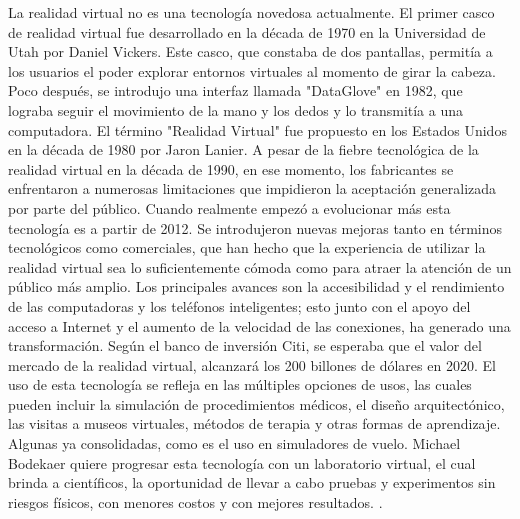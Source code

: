 La realidad virtual no es una tecnología novedosa actualmente. El primer casco de realidad virtual fue desarrollado en la década de 1970 en la Universidad de Utah por Daniel Vickers. Este casco, que constaba de dos pantallas, permitía a los usuarios el poder explorar entornos virtuales al momento de girar la cabeza. Poco después, se introdujo una interfaz llamada "DataGlove" en 1982, que lograba seguir el movimiento de la mano y los dedos y lo transmitía a una computadora. El término "Realidad Virtual" fue propuesto en los Estados Unidos en la década de 1980 por Jaron Lanier. A pesar de la fiebre tecnológica de la realidad virtual en la década de 1990, en ese momento, los fabricantes se enfrentaron a numerosas limitaciones que impidieron la aceptación generalizada por parte del público. Cuando realmente empezó a evolucionar más esta tecnología es a partir de 2012. Se introdujeron nuevas mejoras tanto en términos tecnológicos como comerciales, que han hecho que la experiencia de utilizar la realidad virtual sea lo suficientemente cómoda como para atraer la atención de un público más amplio. Los principales avances son la accesibilidad y el rendimiento de las computadoras y los teléfonos inteligentes; esto junto con el apoyo del acceso a Internet y el aumento de la velocidad de las conexiones, ha generado una transformación. Según el banco de inversión Citi, se esperaba que el valor del mercado de la realidad virtual, alcanzará los 200 billones de dólares en 2020. El uso de esta tecnología se refleja en las múltiples opciones de usos, las cuales pueden incluir la simulación de procedimientos médicos, el diseño arquitectónico, las visitas a museos virtuales, métodos de terapia y otras formas de aprendizaje. Algunas ya consolidadas, como es el uso en simuladores de vuelo. Michael Bodekaer quiere progresar esta tecnología con un laboratorio virtual, el cual brinda a científicos, la oportunidad de llevar a cabo pruebas y experimentos sin riesgos físicos, con menores costos y con mejores resultados. \parencite{elmqaddem2019augmented}.
